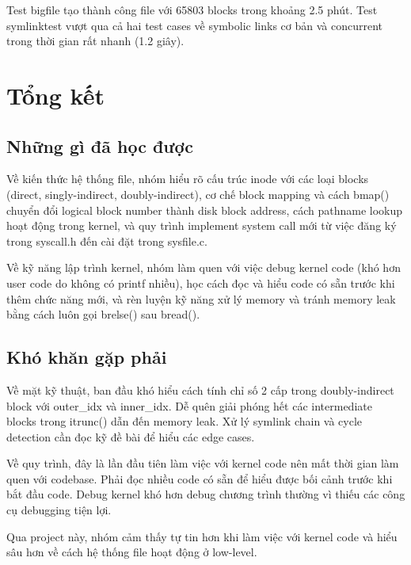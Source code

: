 \documentclass[12pt,a4paper]{article}
\begin{document}
Test bigfile tạo thành công file với 65803 blocks trong khoảng 2.5 phút. Test symlinktest vượt qua cả hai test cases về symbolic links cơ bản và concurrent trong thời gian rất nhanh (1.2 giây).

\section{Tổng kết}

\subsection{Những gì đã học được}

Về kiến thức hệ thống file, nhóm hiểu rõ cấu trúc inode với các loại blocks (direct, singly-indirect, doubly-indirect), cơ chế block mapping và cách bmap() chuyển đổi logical block number thành disk block address, cách pathname lookup hoạt động trong kernel, và quy trình implement system call mới từ việc đăng ký trong syscall.h đến cài đặt trong sysfile.c.

Về kỹ năng lập trình kernel, nhóm làm quen với việc debug kernel code (khó hơn user code do không có printf nhiều), học cách đọc và hiểu code có sẵn trước khi thêm chức năng mới, và rèn luyện kỹ năng xử lý memory và tránh memory leak bằng cách luôn gọi brelse() sau bread().

\subsection{Khó khăn gặp phải}

Về mặt kỹ thuật, ban đầu khó hiểu cách tính chỉ số 2 cấp trong doubly-indirect block với outer\_idx và inner\_idx. Dễ quên giải phóng hết các intermediate blocks trong itrunc() dẫn đến memory leak. Xử lý symlink chain và cycle detection cần đọc kỹ đề bài để hiểu các edge cases.

Về quy trình, đây là lần đầu tiên làm việc với kernel code nên mất thời gian làm quen với codebase. Phải đọc nhiều code có sẵn để hiểu được bối cảnh trước khi bắt đầu code. Debug kernel khó hơn debug chương trình thường vì thiếu các công cụ debugging tiện lợi.

Qua project này, nhóm cảm thấy tự tin hơn khi làm việc với kernel code và hiểu sâu hơn về cách hệ thống file hoạt động ở low-level.
\end{document}
